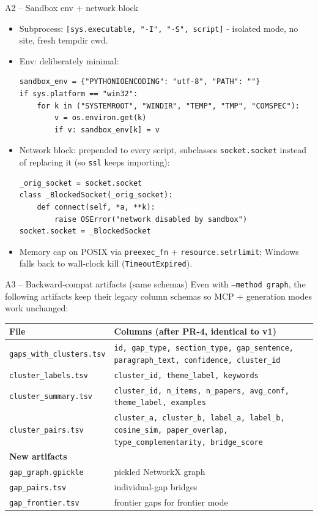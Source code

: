 \documentclass[10pt,aspectratio=169]{beamer}
\newcommand{\flag}[1]{\texttt{\small#1}}
\begin{document}
\begin{frame}[fragile]{A2 -- Sandbox env + network block}
  \scriptsize
  \begin{itemize}
    \item Subprocess: \texttt{[sys.executable, "-I", "-S", script]} -
      isolated mode, no site, fresh tempdir cwd.
    \item Env: deliberately minimal:
      \begin{lstlisting}
sandbox_env = {"PYTHONIOENCODING": "utf-8", "PATH": ""}
if sys.platform == "win32":
    for k in ("SYSTEMROOT", "WINDIR", "TEMP", "TMP", "COMSPEC"):
        v = os.environ.get(k)
        if v: sandbox_env[k] = v
      \end{lstlisting}
    \item Network block: prepended to every script, subclasses
      \texttt{socket.socket} instead of replacing it (so \texttt{ssl}
      keeps importing):
      \begin{lstlisting}
_orig_socket = socket.socket
class _BlockedSocket(_orig_socket):
    def connect(self, *a, **k):
        raise OSError("network disabled by sandbox")
socket.socket = _BlockedSocket
      \end{lstlisting}
    \item Memory cap on POSIX via \texttt{preexec\_fn} + \texttt{resource.setrlimit};
      Windows falls back to wall-clock kill (\texttt{TimeoutExpired}).
  \end{itemize}
\end{frame}

\begin{frame}{A3 -- Backward-compat artifacts (same schemas)}
  \scriptsize
  Even with \flag{--method graph}, the following artifacts keep their
  legacy column schemas so MCP + generation modes work unchanged:
  \vspace{0.5em}
  \begin{tabular}{@{}l p{8cm}@{}}
    \toprule
    File & Columns (after PR-4, identical to v1) \\
    \midrule
    \texttt{gaps\_with\_clusters.tsv} & \texttt{id, gap\_type, section\_type, gap\_sentence, paragraph\_text, confidence, cluster\_id} \\
    \texttt{cluster\_labels.tsv}      & \texttt{cluster\_id, theme\_label, keywords} \\
    \texttt{cluster\_summary.tsv}     & \texttt{cluster\_id, n\_items, n\_papers, avg\_conf, theme\_label, examples} \\
    \texttt{cluster\_pairs.tsv}       & \texttt{cluster\_a, cluster\_b, label\_a, label\_b, cosine\_sim, paper\_overlap, type\_complementarity, bridge\_score} \\
    \midrule
    \textbf{New artifacts} & \\
    \texttt{gap\_graph.gpickle}       & pickled NetworkX graph \\
    \texttt{gap\_pairs.tsv}           & individual-gap bridges \\
    \texttt{gap\_frontier.tsv}        & frontier gaps for frontier mode \\
    \bottomrule
  \end{tabular}
\end{frame}
\end{document}
